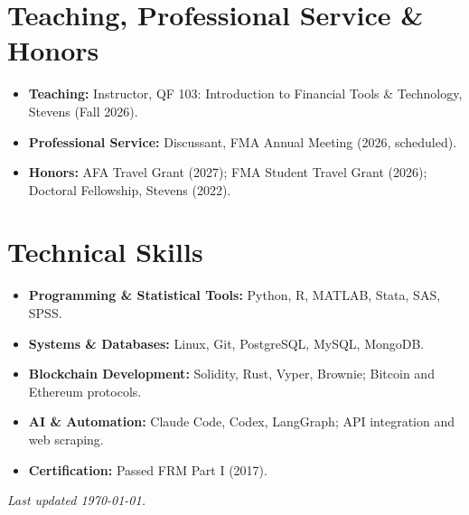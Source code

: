 \documentclass[letterpaper,11pt]{article}
\makeatletter
\newcommand{\resumeItem}[1]{
  \item\small{
    {#1 \vspace{-2pt}}
  }
}
\newcommand{\resumeSubheading}[4]{
  \vspace{-2pt}\item
    \begin{tabular*}{1.0\textwidth}[t]{l@{\extracolsep{\fill}}r}
      \textbf{#1} & \textbf{\small #2} \\
      \textit{\small#3} & \textit{\small #4} \\
    \end{tabular*}\vspace{-7pt}
}
\newcommand{\resumeSubHeadingListStart}{\begin{itemize}[leftmargin=0.0in, label={}]}
\newcommand{\resumeSubHeadingListEnd}{\end{itemize}}
\newcommand{\resumeItemListStart}{\begin{itemize}[itemsep=0pt]}
\newcommand{\resumeItemListEnd}{\end{itemize}\vspace{-5pt}}
\makeatother
\begin{document}
\section{Teaching, Professional Service \& Honors}
\begin{itemize}[leftmargin=0in, label={}, itemsep=0pt, parsep=0pt]
  \small
  \item \textbf{Teaching:} Instructor, QF 103: Introduction to Financial Tools \& Technology, Stevens (Fall 2026).
  \item \textbf{Professional Service:} Discussant, FMA Annual Meeting (2026, scheduled).
  \item \textbf{Honors:} AFA Travel Grant (2027); FMA Student Travel Grant (2026); Doctoral Fellowship, Stevens (2022).
\end{itemize}
\vspace{-16pt}

\section{Technical Skills}
 \begin{itemize}[leftmargin=0in, label={}, itemsep=0pt, parsep=0pt]
    \small
    \item \textbf{Programming \& Statistical Tools:} Python, R, MATLAB, Stata, SAS, SPSS.
    \item \textbf{Systems \& Databases:} Linux, Git, PostgreSQL, MySQL, MongoDB.
    \item \textbf{Blockchain Development:} Solidity, Rust, Vyper, Brownie; Bitcoin and Ethereum protocols.
    \item \textbf{AI \& Automation:} Claude Code, Codex, LangGraph; API integration and web scraping.
    \item \textbf{Certification:} Passed FRM Part I (2017).
 \end{itemize}
 \emph{Last updated {\today}.}
 \vspace{-16pt}


        
\end{document}
